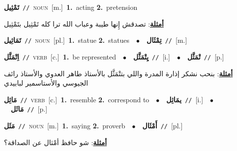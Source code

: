 \documentclass[10pt,a4paper,twoside]{article} %
\begin{document}
\begin{multicols}{2}
{{{{{{{{{{{{{\setlength\topsep{0pt}\textbf{\foreignlanguage{arabic}{تَمْثِيل}}\ {\color{gray}\texttt{//}\color{black}}\ \textsc{noun}\ [m.]\ \textbf{1.}~acting  \textbf{2.}~pretension\  \begin{flushright}\color{gray}\foreignlanguage{arabic}{\textbf{\underline{\foreignlanguage{arabic}{أمثلة}}}: تصدقش إِنها طيبة وعباب الله ترا كله تَمْثِيل بتَمْثِيل}\end{flushright}\color{black}} \vspace{2mm}

{\setlength\topsep{0pt}\textbf{\foreignlanguage{arabic}{تَمَاثِيل}}\ {\color{gray}\texttt{//}\color{black}}\ \textsc{noun}\ [pl.]\ \textbf{1.}~statue  \textbf{2.}~statues\ \ $\bullet$\ \ \setlength\topsep{0pt}\textbf{\foreignlanguage{arabic}{تِمْثَال}}\ {\color{gray}\texttt{//}\color{black}}\ [m.]\ 

{\setlength\topsep{0pt}\textbf{\foreignlanguage{arabic}{اِتْمَثَّل}}\ {\color{gray}\texttt{//}\color{black}}\ \textsc{verb}\ [c.]\ \textbf{1.}~be represented\ \ $\bullet$\ \ \setlength\topsep{0pt}\textbf{\foreignlanguage{arabic}{يِتْمَثَّل}}\ {\color{gray}\texttt{//}\color{black}}\ [i.]\ \ $\bullet$\ \ \setlength\topsep{0pt}\textbf{\foreignlanguage{arabic}{تْمَثَّل}}\ {\color{gray}\texttt{//}\color{black}}\ [p.]\  \begin{flushright}\color{gray}\foreignlanguage{arabic}{\textbf{\underline{\foreignlanguage{arabic}{أمثلة}}}: بنحب نشكر إذارة المدرة واللي بتتْمَثَّل بالأستاذ طاهر العدوي والأستاذ رائف الجيوسي والأستاسمير لبابيدي}\end{flushright}\color{black}} \vspace{2mm}

{\setlength\topsep{0pt}\textbf{\foreignlanguage{arabic}{مَاثِل}}\ {\color{gray}\texttt{//}\color{black}}\ \textsc{verb}\ [c.]\ \textbf{1.}~resemble  \textbf{2.}~correspond to\ \ $\bullet$\ \ \setlength\topsep{0pt}\textbf{\foreignlanguage{arabic}{يمَاثِل}}\ {\color{gray}\texttt{//}\color{black}}\ [i.]\ \ $\bullet$\ \ \setlength\topsep{0pt}\textbf{\foreignlanguage{arabic}{مَاثَل}}\ {\color{gray}\texttt{//}\color{black}}\ [p.]\ 

{\setlength\topsep{0pt}\textbf{\foreignlanguage{arabic}{مَثَل}}\ {\color{gray}\texttt{//}\color{black}}\ \textsc{noun}\ [m.]\ \textbf{1.}~saying  \textbf{2.}~proverb\ \ $\bullet$\ \ \setlength\topsep{0pt}\textbf{\foreignlanguage{arabic}{أَمْثَال}}\ {\color{gray}\texttt{//}\color{black}}\ [pl.]\  \begin{flushright}\color{gray}\foreignlanguage{arabic}{\textbf{\underline{\foreignlanguage{arabic}{أمثلة}}}: شو حافظ أمْثال عن الصداقة؟}\end{flushright}\color{black}} \vspace{2mm}

}}}}}}}}}}}}}}
\end{multicols}
\end{document}
